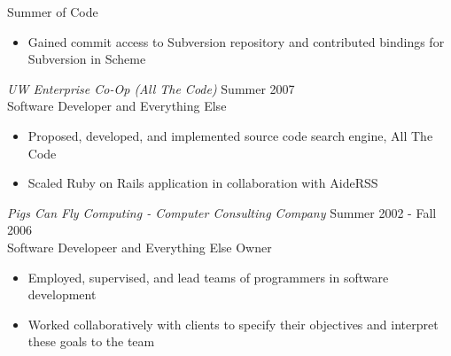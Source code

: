 \documentclass[10pt,line,margin=0.1]{newsres}
\begin{document}
\begin{resume}
        Summer of Code
        \begin{itemize}
        \item Gained commit access to Subversion repository and contributed bindings for Subversion in Scheme
        \end{itemize} 
        {\sl UW Enterprise Co-Op (All The Code)} \hfill Summer 2007 \\
        Software Developer and Everything Else
        \begin{itemize}  \itemsep -2pt %
        \item{Proposed, developed, and implemented source code search engine, All The Code}
        \item{Scaled Ruby on Rails application in collaboration with AideRSS}
        \end{itemize}
        {\sl Pigs Can Fly Computing - Computer Consulting Company} \hfill Summer 2002 - Fall 2006 \\
        Software Developeer and Everything Else Owner
        \begin{itemize}  \itemsep -2pt %
        \item{Employed, supervised, and lead teams of programmers in software development}
        \item{Worked collaboratively with clients to specify their objectives and interpret these goals to the team}
        \end{itemize}


\end{resume}
\end{document}
